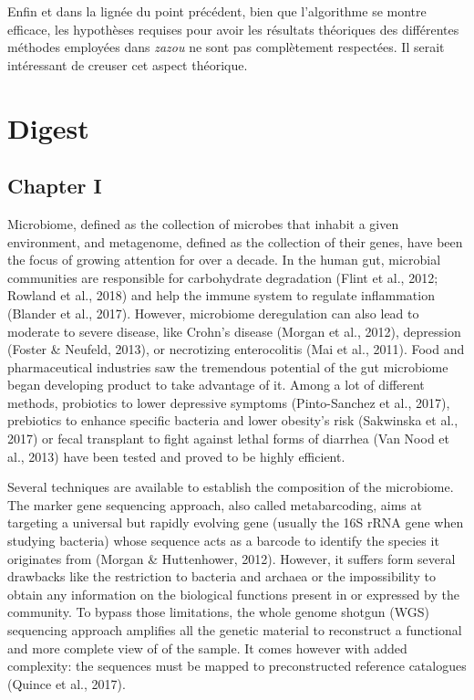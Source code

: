 \documentclass[12pt,a4paper]{reedthesis}
\theoremstyle{definition}
\theoremstyle{definition}
\theoremstyle{definition}
\theoremstyle{remark}
\begin{document}
Enfin et dans la lignée du point précédent, bien que l'algorithme se montre efficace, les hypothèses requises pour avoir les résultats théoriques des différentes méthodes employées dans \emph{zazou} ne sont pas complètement respectées. Il serait intéressant de creuser cet aspect théorique.

\hypertarget{digest}{%
\chapter*{Digest}\label{digest}}

\hypertarget{chapter-i}{%
\section*{Chapter I}\label{chapter-i}}

Microbiome, defined as the collection of microbes that inhabit a given environment, and metagenome, defined as the collection of their genes, have been the focus of growing attention for over a decade. In the human gut, microbial communities are responsible for carbohydrate degradation (Flint et al., 2012; Rowland et al., 2018) and help the immune system to regulate inflammation (Blander et al., 2017). However, microbiome deregulation can also lead to moderate to severe disease, like Crohn's disease (Morgan et al., 2012), depression (Foster \& Neufeld, 2013), or necrotizing enterocolitis (Mai et al., 2011). Food and pharmaceutical industries saw the tremendous potential of the gut microbiome began developing product to take advantage of it. Among a lot of different methods, probiotics to lower depressive symptoms (Pinto-Sanchez et al., 2017), prebiotics to enhance specific bacteria and lower obesity's risk (Sakwinska et al., 2017) or fecal transplant to fight against lethal forms of diarrhea (Van Nood et al., 2013) have been tested and proved to be highly efficient.

Several techniques are available to establish the composition of the microbiome. The marker gene sequencing approach, also called metabarcoding, aims at targeting a universal but rapidly evolving gene (usually the 16S rRNA gene when studying bacteria) whose sequence acts as a barcode to identify the species it originates from (Morgan \& Huttenhower, 2012). However, it suffers form several drawbacks like the restriction to bacteria and archaea or the impossibility to obtain any information on the biological functions present in or expressed by the community. To bypass those limitations, the whole genome shotgun (WGS) sequencing approach amplifies all the genetic material to reconstruct a functional and more complete view of of the sample. It comes however with added complexity: the sequences must be mapped to preconstructed reference catalogues (Quince et al., 2017).
\end{document}
